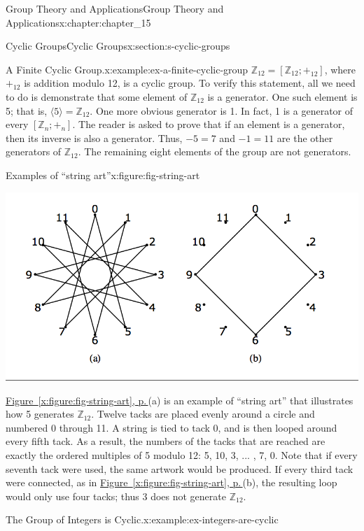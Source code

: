 \documentclass[twoside,10pt,]{book}
\newcommand{\xreffont}{\relax}
\numberwithin{equation}{section}
\begin{document}
\begin{chapterptx}{Group Theory and Applications}{}{Group Theory and Applications}{}{}{x:chapter:chapter_15}
\begin{sectionptx}{Cyclic Groups}{}{Cyclic Groups}{}{}{x:section:s-cyclic-groups}
\begin{example}{A Finite Cyclic Group.}{x:example:ex-a-finite-cyclic-group}
\(\mathbb{Z}_{12} = [\mathbb{Z}_{12}; +_{12} ]\),  where \(+_{12}\) is addition modulo 12, is a cyclic group. To verify this statement, all we need to do is demonstrate that some element of \(\mathbb{Z}_{12}\)  is a generator. One such element is 5; that is, \(\langle 5 \rangle = \mathbb{Z}_{12}\). One more obvious generator is 1. In fact, 1 is a generator of every \([\mathbb{Z}_n; +_n]\). The reader is asked to prove that if an element is a generator, then its inverse is also a generator. Thus, \(-5 = 7\) and \(-1 = 11\) are the other generators of \(\mathbb{Z}_{12}\). The remaining eight elements of the group are not generators.%
\begin{figureptx}{Examples of ``string art''}{x:figure:fig-string-art}{}%
\begin{image}{0.15}{0.7}{0.15}%
\includegraphics[width=\linewidth]{images/fig-string-art.png}
\end{image}%
\tcblower
\end{figureptx}%
\hyperref[x:figure:fig-string-art]{Figure~{\xreffont\ref{x:figure:fig-string-art}}, p.\,\pageref{x:figure:fig-string-art}}(a)  is an example of ``string art'' that illustrates how 5 generates \(\mathbb{Z}_{12}\). Twelve tacks are placed evenly around a circle and numbered 0 through 11. A string is tied to tack 0, and is then looped around every fifth tack. As a result, the numbers of the tacks that are reached are exactly the ordered multiples of 5 modulo 12: 5, 10, 3, ... , 7, 0.  Note that if every seventh tack were used, the same artwork would be produced. If every third tack were connected, as in \hyperref[x:figure:fig-string-art]{Figure~{\xreffont\ref{x:figure:fig-string-art}}, p.\,\pageref{x:figure:fig-string-art}}(b), the resulting loop would only use four tacks; thus 3 does not generate \(\mathbb{Z}_{12}\).%
\end{example}
\begin{example}{The Group of Integers is Cyclic.}{x:example:ex-integers-are-cyclic}%

\end{example}
\end{sectionptx}
\end{chapterptx}
\end{document}
